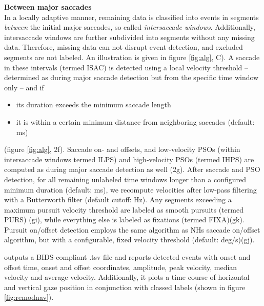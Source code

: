 \textbf{Between major saccades}\\
%
In a locally adaptive manner, remaining data is classified into events in
segments \textit{between} the initial major saccades, so called
\textit{intersaccade windows}. Additionally, intersaccade windows are further
subdivided into segments without any missing data. Therefore, missing data can
not disrupt event detection, and excluded segments are not labeled. An
illustration is given in figure \ref{fig:alg}, C). A saccade in these intervals
(termed ISAC) is detected using a local velocity threshold -- determined as
during major saccade detection but from the specific time window only -- and if
%
\begin{itemize}
\item its duration exceeds the minimum saccade length
\item it is within a certain minimum distance from neighboring saccades
  (default: \unit[130]{ms})
\end{itemize}
%
(figure \ref{fig:alg}, 2f). Saccade on- and offsets, and low-velocity PSOs
(within intersaccade windows termed ILPS) and high-velocity PSOs (termed IHPS)
are computed as during major saccade detection as well (2g). After saccade and
PSO detection, for all remaining unlabeled time windows longer than a
configured minimum duration (default: \unit[40]{ms}), we recompute velocities
after low-pass filtering with a Butterworth filter (default  cutoff:
\unit[4]{Hz}). Any segments exceeding a maximum pursuit velocity threshold are
labeled as smooth pursuits  (termed PURS) (gi), while everything else is
labeled as fixations (termed FIXA)(gk). Pursuit on/offset detection  employs
the same algorithm as NHs saccade on/offset algorithm, but with a configurable,
fixed velocity threshold (default: \unit[2]{deg/s})(gj).

\remodnav outputs a BIDS-compliant \citep{gorgolewski2016brain} .tsv file and
reports detected events with onset and offset time, onset and offset
coordinates, amplitude, peak velocity, median velocity and average velocity.
Additionally, it plots a time course of horizontal and vertical gaze position
in conjunction with classed labels (shown in figure \ref{fig:remodnav}).


